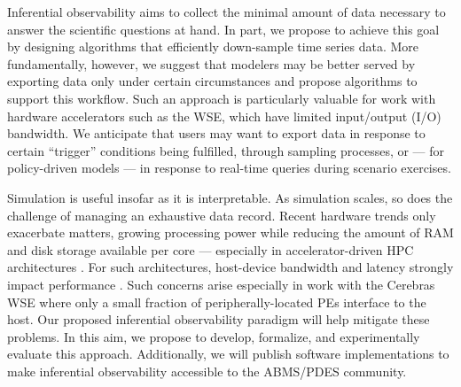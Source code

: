 Inferential observability aims to collect the minimal amount of data necessary to answer the scientific questions at hand.
In part, we propose to achieve this goal by designing algorithms that efficiently down-sample time series data.
More fundamentally, however, we suggest that modelers may be better served by exporting data only under certain circumstances and propose algorithms to support this workflow.
Such an approach is particularly valuable for work with hardware accelerators such as the WSE, which have limited input/output (I/O) bandwidth.
We anticipate that users may want to export data in response to certain ``trigger'' conditions being fulfilled, through sampling processes, or --- for policy-driven models --- in response to real-time queries during scenario exercises.

Simulation is useful insofar as it is interpretable.
As simulation scales, so does the challenge of managing an exhaustive data record.
Recent hardware trends only exacerbate matters, growing processing power while reducing the amount of RAM and disk storage available per core --- especially in accelerator-driven HPC architectures \citep{khan2021analysis,gholami2024ai}.
For such architectures, host-device bandwidth and latency strongly impact performance \citep{kwon2018beyond}.
Such concerns arise especially in work with the Cerebras WSE where only a small fraction of peripherally-located PEs interface to the host.
Our proposed inferential observability paradigm will help mitigate these problems.
In this aim, we propose to develop, formalize, and experimentally evaluate this approach.
Additionally, we will publish software implementations to make inferential observability accessible to the ABMS/PDES community.
